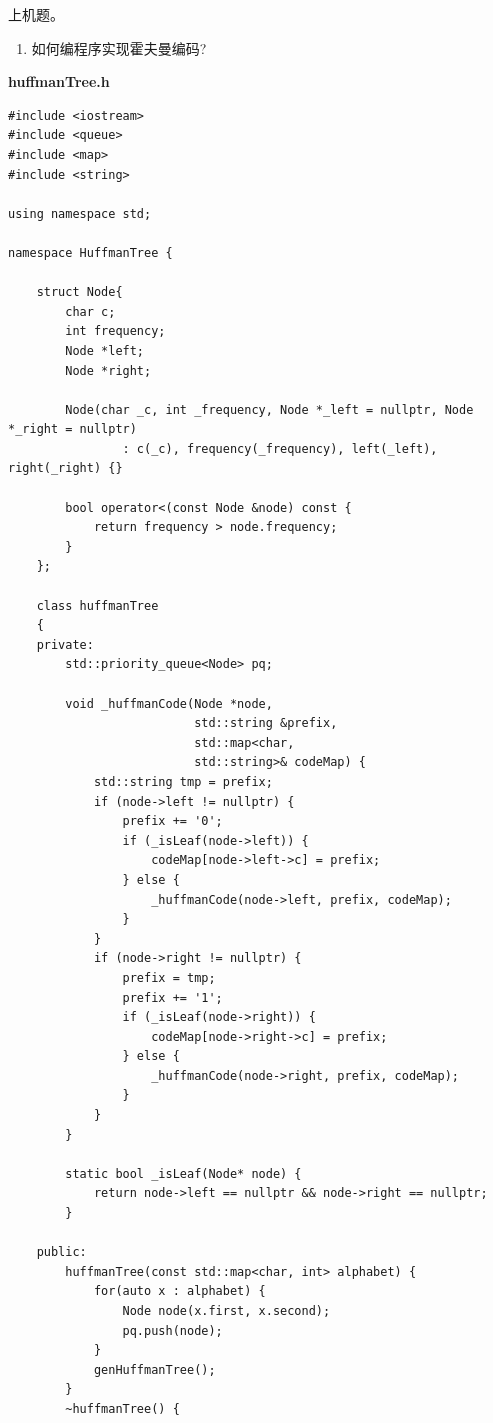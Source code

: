 \documentclass[onecolumn,oneside]{BUPTHomework}
\begin{document}
  \begin{problem}[19]
  {
    上机题。
    \begin{enumerate}
      \item 如何编程序实现霍夫曼编码?
    \end{enumerate}
  }
  \end{problem}

  \begin{solution}
  {
    \textbf{\textsf{huffmanTree.h}}
\begin{lstlisting}
#include <iostream>
#include <queue>
#include <map>
#include <string>

using namespace std;

namespace HuffmanTree {

    struct Node{
        char c;
        int frequency;
        Node *left;
        Node *right;

        Node(char _c, int _frequency, Node *_left = nullptr, Node *_right = nullptr)
                : c(_c), frequency(_frequency), left(_left), right(_right) {}

        bool operator<(const Node &node) const {
            return frequency > node.frequency;
        }
    };

    class huffmanTree
    {
    private:
        std::priority_queue<Node> pq;

        void _huffmanCode(Node *node,
                          std::string &prefix,
                          std::map<char,
                          std::string>& codeMap) {
            std::string tmp = prefix;
            if (node->left != nullptr) {
                prefix += '0';
                if (_isLeaf(node->left)) {
                    codeMap[node->left->c] = prefix;
                } else {
                    _huffmanCode(node->left, prefix, codeMap);
                }
            }
            if (node->right != nullptr) {
                prefix = tmp;
                prefix += '1';
                if (_isLeaf(node->right)) {
                    codeMap[node->right->c] = prefix;
                } else {
                    _huffmanCode(node->right, prefix, codeMap);
                }
            }
        }

        static bool _isLeaf(Node* node) {
            return node->left == nullptr && node->right == nullptr;
        }

    public:
        huffmanTree(const std::map<char, int> alphabet) {
            for(auto x : alphabet) {
                Node node(x.first, x.second);
                pq.push(node);
            }
            genHuffmanTree();
        }
        ~huffmanTree() {


\end{lstlisting}}
\end{solution}
\end{document}
